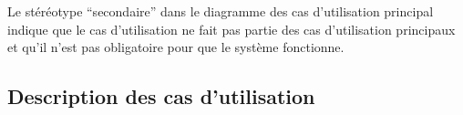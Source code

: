 Le stéréotype ``secondaire'' dans le diagramme des cas d'utilisation principal indique que le cas d'utilisation ne fait pas partie des cas d'utilisation principaux et qu'il n'est pas obligatoire pour que le système fonctionne.

\subsection{Description des cas d'utilisation}















